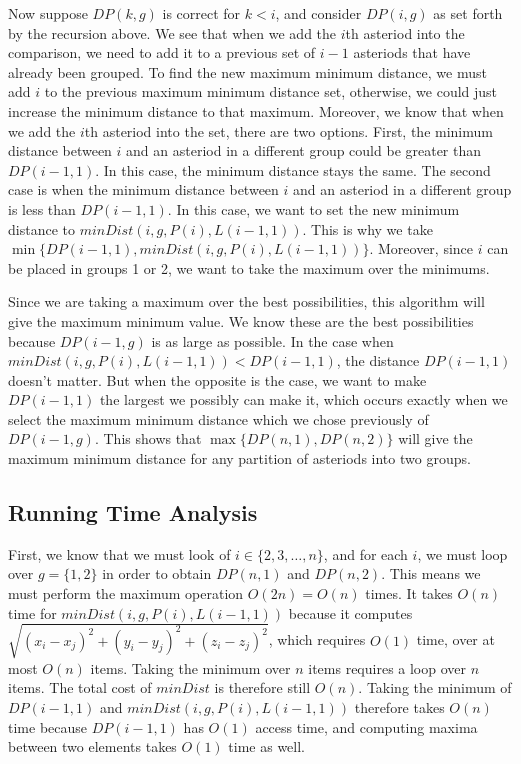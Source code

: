 \documentclass{6046}
\begin{document}
Now suppose $DP(k, g)$ is correct for $k < i$, and consider $DP(i, g)$ as set forth by the recursion above. We see that when we add the $i$th asteriod into the comparison, we need to add it to a previous set of $i-1$ asteriods that have already been grouped. To find the new maximum minimum distance, we must add $i$ to the previous maximum minimum distance set, otherwise, we could just increase the minimum distance to that maximum. Moreover, we know that when we add the $i$th asteriod into the set, there are two options. First, the minimum distance between $i$ and an asteriod in a different group could be greater than $DP(i - 1, 1)$. In this case, the minimum distance stays the same. The second case is when the minimum distance between $i$ and an asteriod in a different group is less than $DP(i - 1, 1)$. In this case, we want to set the new minimum distance to $minDist(i, g, P(i), L(i-1,1))$. This is why we take $\min\{ DP(i - 1, 1) , minDist(i, g, P(i), L(i-1, 1)) \}$. Moreover, since $i$ can be placed in groups 1 or 2, we want to take the maximum over the minimums. 

Since we are taking a maximum over the best possibilities, this algorithm will give the maximum minimum value. We know these are the best possibilities because $DP(i - 1, g)$ is as large as possible. In the case when $minDist(i, g, P(i), L(i-1, 1)) < DP(i-1,1)$, the distance $DP(i-1,1)$ doesn't matter. But when the opposite is the case, we want to make $DP(i-1,1)$ the largest we possibly can make it, which occurs exactly when we select the maximum minimum distance which we chose previously of $DP(i-1,g)$. This shows that $\max\{DP(n, 1),  DP(n, 2) \}$ will give the maximum minimum distance for any partition of asteriods into two groups.

\subsection*{Running Time Analysis}

First, we know that we must look of $i \in \{ 2, 3, \ldots, n \}$, and for each $i$, we must loop over $g = \{1, 2 \}$ in order to obtain $DP(n, 1)$ and $DP(n ,2)$. This means we must perform the maximum operation $O(2n) = O(n)$ times. It takes $O(n)$ time for $minDist(i, g, P(i), L(i-1, 1))$ because it computes  $\sqrt{ (x_i - x_j)^2 + (y_i - y_j)^2 + (z_i - z_j)^2 }$, which requires $O(1)$ time, over at most $O(n)$ items. Taking the minimum over $n$ items requires a loop over $n$ items. The total cost of $minDist$ is therefore still $O(n)$. Taking the minimum of $DP(i-1, 1)$ and $minDist(i, g, P(i), L(i-1,1))$ therefore takes $O(n)$ time because $DP(i-1,1)$ has $O(1)$ access time, and computing maxima between two elements takes $O(1)$ time as well. 
\end{document}
